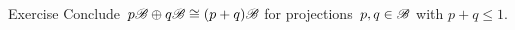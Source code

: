 \documentclass[b]{subfiles}
\begin{document}
\begin{parsec}
\begin{point}[onb2]{Exercise}
Conclude~$p \mathscr{B} \oplus q \mathscr{B} \cong (p+q) \mathscr{B}$
    for projections~$p,q \in \mathscr{B}$ with $p+q \leq 1$.
\end{point}


\end{parsec}
\end{document}
